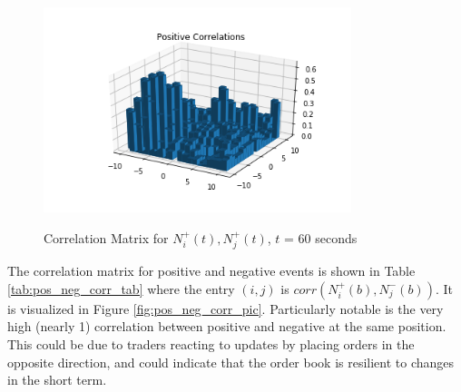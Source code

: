 \begin{figure}[t]
\begin{center}
\label{fig:pos_pos_corr_pic}
\includegraphics[width=0.8\textwidth]{LaTeX/Figures/pos_pos_correlations.png}
\caption{Correlation Matrix for $N^{+}_i(t), N^{+}_j(t)$, $t$ = 60 seconds}
\end{center}
\end{figure}

The correlation matrix for positive and negative events is shown in Table \ref{tab:pos_neg_corr_tab} where the entry $(i,j)$ is $corr(N^{+}_i(b), N^{-}_j(b))$. It is visualized in Figure \ref{fig:pos_neg_corr_pic}. Particularly notable is the very high (nearly 1) correlation between positive and negative at the same position. This could be due to traders reacting to updates by placing orders in the opposite direction, and could indicate that the order book is resilient to changes in the short term.

